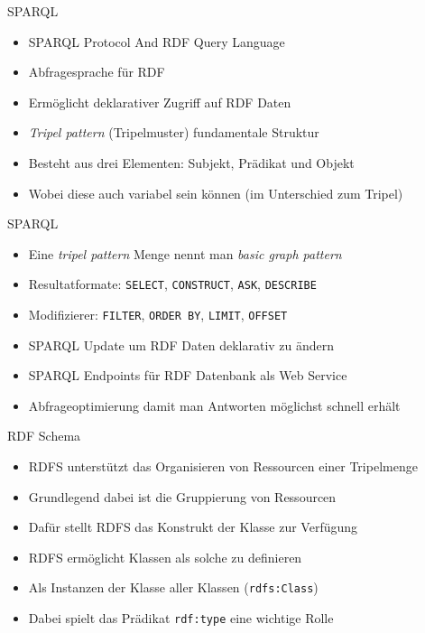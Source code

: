 \documentclass{beamer}
\begin{document}
\begin{frame}{SPARQL}
	
	\begin{itemize}
		\item SPARQL Protocol And RDF Query Language
		\item Abfragesprache für RDF
		\item Ermöglicht deklarativer Zugriff auf RDF Daten
		\item \emph{Tripel pattern} (Tripelmuster) fundamentale Struktur
		\item Besteht aus drei Elementen: Subjekt, Prädikat und Objekt
		\item Wobei diese auch variabel sein können (im Unterschied zum Tripel)
	\end{itemize}
	
\end{frame}

\begin{frame}{SPARQL}
	
	\begin{itemize}
		\item Eine \emph{tripel pattern} Menge nennt man \emph{basic graph pattern}
		\item Resultatformate: \texttt{SELECT}, \texttt{CONSTRUCT}, \texttt{ASK}, \texttt{DESCRIBE}
		\item Modifizierer: \texttt{FILTER}, \texttt{ORDER BY}, \texttt{LIMIT}, \texttt{OFFSET}
		\item SPARQL Update um RDF Daten deklarativ zu ändern
		\item SPARQL Endpoints für RDF Datenbank als Web Service
		\item Abfrageoptimierung damit man Antworten möglichst schnell erhält
	\end{itemize}
	
\end{frame}

\begin{frame}{RDF Schema}
	
	\begin{itemize}
		\item RDFS unterstützt das Organisieren von Ressourcen einer Tripelmenge
		\item Grundlegend dabei ist die Gruppierung von Ressourcen
		\item Dafür stellt RDFS das Konstrukt der Klasse zur Verfügung
		\item RDFS ermöglicht Klassen als solche zu definieren
		\item Als Instanzen der Klasse aller Klassen (\texttt{rdfs:Class})
		\item Dabei spielt das Prädikat \texttt{rdf:type} eine wichtige Rolle
	\end{itemize}
	
\end{frame}
\end{document}
